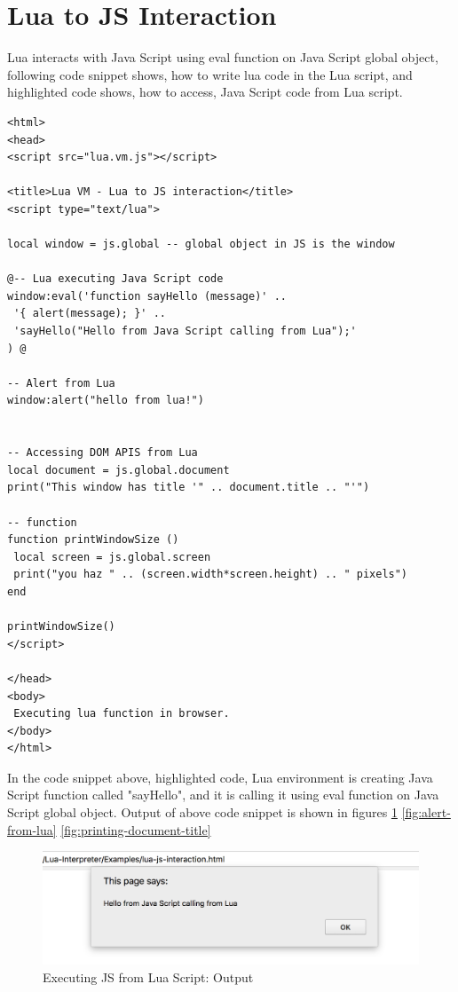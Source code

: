 \section{Lua to JS Interaction}

Lua interacts with Java Script using eval function on Java Script global object, following code snippet shows, how to write lua code in the Lua script, and highlighted code shows, how to access, Java Script code from Lua script.

\begin{lstlisting}[frame=single, style=base]
<html>
<head>
<script src="lua.vm.js"></script>

<title>Lua VM - Lua to JS interaction</title>
<script type="text/lua">

local window = js.global -- global object in JS is the window

@-- Lua executing Java Script code
window:eval('function sayHello (message)' ..
 '{ alert(message); }' ..
 'sayHello("Hello from Java Script calling from Lua");'
) @

-- Alert from Lua
window:alert("hello from lua!")


-- Accessing DOM APIS from Lua
local document = js.global.document
print("This window has title '" .. document.title .. "'")

-- function
function printWindowSize ()
 local screen = js.global.screen
 print("you haz " .. (screen.width*screen.height) .. " pixels")
end

printWindowSize()
</script>

</head>
<body>
 Executing lua function in browser.
</body>
</html>
\end{lstlisting}

In the code snippet above, highlighted code, Lua environment is creating Java Script function called "sayHello", and it is calling it using eval function on Java Script global object. Output of above code snippet is shown in figures \ref{fig:alert-from-javascript-eval} \ref{fig:alert-from-lua} \ref{fig:printing-document-title}

\begin{figure}[H]
	\begin{center}
		\includegraphics[width=\linewidth]{./images/alert-from-javascript-eval.png}
	\end{center}
	\caption{Executing JS from Lua Script: Output}
	\label{fig:alert-from-javascript-eval}
\end{figure}

